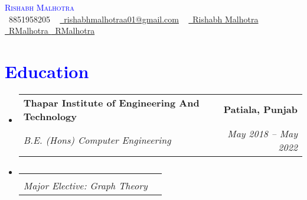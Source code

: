 \documentclass[letterpaper,11pt]{article}
\makeatletter
\newcommand{\resumeSubheading}[4]{
  \vspace{-2pt}\item
    \begin{tabular*}{1.0\textwidth}[t]{l@{\extracolsep{\fill}}r}
      \textbf{#1} & \textbf{\small #2} \\
      \textit{\small#3} & \textit{\small #4} \\
    \end{tabular*}\vspace{-7pt}
}
\newcommand{\resumeSubHeadingListStart}{\begin{itemize}[leftmargin=0.0in, label={}]}
\newcommand{\resumeSubHeadingListEnd}{\end{itemize}}
\makeatother
\begin{document}

\begin{center}
    {\Huge \scshape \textcolor{blue}{ Rishabh Malhotra}} \\ \vspace{5pt}
    \small \raisebox{-0.1\height}\faPhone\ 8851958205 ~ \href{mailto:rishabhmalhotraa01@gmail.com}{\raisebox{-0.2\height}\faEnvelope\  rishabhmalhotraa01@gmail.com} ~ 
    \href{https://linkedin.com/in/rishabh-malhotra-4536a418b/}{\raisebox{-0.2\height}\faLinkedin\ Rishabh Malhotra}  ~
    \href{https://github.com/Rishabh-malhotraa}{\raisebox{-0.2\height}\faGithub\ RMalhotra   }
    \href{https://linktr.ee/Rishabh_malhotra}{\raisebox{-0.2\height}\faCode\ RMalhotra}
    \vspace{-8pt}
\end{center}\vspace{+10pt}


    \section{\Large \textcolor{blue}{Education}}
  \resumeSubHeadingListStart
    \resumeSubheading
      {Thapar Institute of Engineering And Technology}{Patiala, Punjab}
      {B.E. (Hons) Computer Engineering }{May 2018 -- May 2022}
    
      \vspace{-18pt} 
      \resumeSubheading{}{}  
      {Major Elective: Graph Theory}{}
      
  \resumeSubHeadingListEnd
\end{document}

